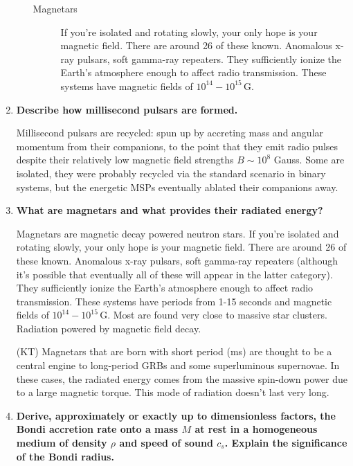 \documentclass[a4paper]{article}
\begin{document}
\begin{enumerate}
\begin{enumerate}
\begin{description}
\item[Magnetars] If you're isolated and rotating slowly, your only hope is your magnetic field. There are around 26 of these known. Anomalous x-ray pulsars, soft gamma-ray repeaters. They sufficiently ionize the Earth's atmosphere enough to affect radio transmission. These systems have magnetic fields of $10^{14}-10^{15}\,$G.
\end{description}

\end{enumerate}

\item \textbf{Describe how millisecond pulsars are formed.}

Millisecond pulsars are recycled: spun up by accreting mass and angular momentum from their companions, to the point that they emit radio pulses despite their relatively low magnetic field strengths $B \sim 10^8$ Gauss. Some are isolated, they were probably recycled via the standard scenario in binary systems, but the energetic MSPs eventually ablated their companions away. 

\item \textbf{What are magnetars and what provides their radiated energy?}

Magnetars are magnetic decay powered neutron stars. 
If you're isolated and rotating slowly, your only hope is your magnetic field. There are around 26 of these known. Anomalous x-ray pulsars, soft gamma-ray repeaters (although it's possible that eventually all of these will appear in the latter category). They sufficiently ionize the Earth's atmosphere enough to affect radio transmission. These systems have periods from 1-15 seconds and magnetic fields of $10^{14}-10^{15}\,$G. Most are found very close to massive star clusters. 
Radiation powered by magnetic field decay.

(KT) Magnetars that are born with short period (ms) are thought to be a central engine to long-period GRBs and some superluminous supernovae. In these cases, the radiated energy comes from the massive spin-down power due to a large magnetic torque. This mode of radiation doesn't last very long. 

\item \textbf{Derive, approximately or exactly up to dimensionless factors, the Bondi accretion rate onto a mass $M$ at rest in a homogeneous medium of density $\rho$ and speed of sound $c_s$. Explain the significance of the Bondi radius.}


\end{enumerate}
\end{document}

